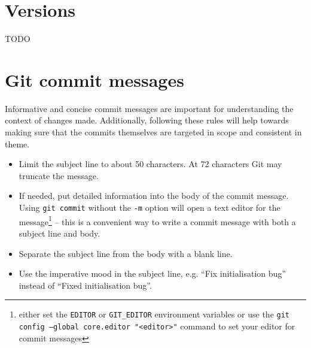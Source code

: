 \documentclass[11pt]{article}
\begin{document}
\section{Versions}
TODO

\section{Git commit messages}
Informative and concise commit messages are important for understanding the context of changes made. 
Additionally, following these rules will help towards making sure that the commits themselves are targeted in scope and consistent in theme. 

\begin{itemize}
    \item Limit the subject line to about 50 characters. At 72 characters Git may truncate the message. 
    \item If needed, put detailed information into the body of the commit message. Using \texttt{git commit} without the \texttt{-m} option will open a text editor for the message\footnote{either set the \texttt{EDITOR} or \texttt{GIT\_EDITOR} environment variables or use the \texttt{git config --global core.editor "<editor>"} command to set your editor for commit messages} -- this is a convenient way to write a commit message with both a subject line and body. 
    \item Separate the subject line from the body with a blank line.
    \item Use the imperative mood in the subject line, e.g. ``Fix initialisation bug'' instead of ``Fixed initialisation bug''.
\end{itemize}
\end{document}
